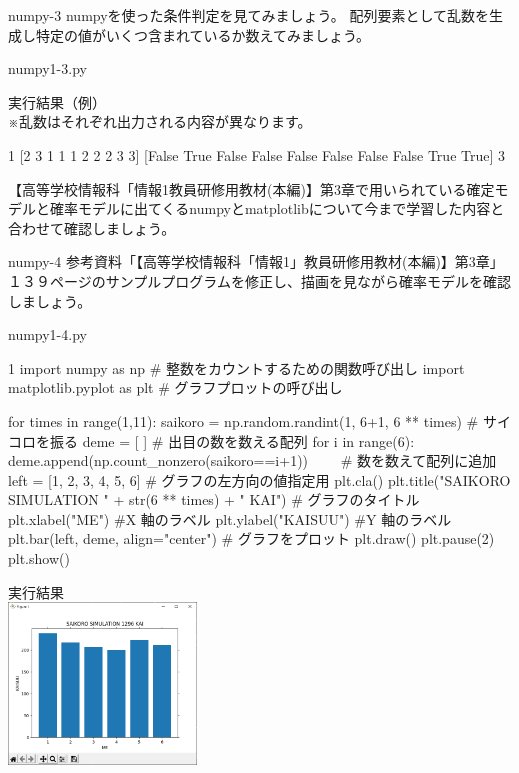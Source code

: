 \newpage
\begin{pabox}{numpy-3}
numpyを使った条件判定を見てみましょう。
配列要素として乱数を生成し特定の値がいくつ含まれているか数えてみましょう。

\begin{legbox}{numpy1-3.py}

実行結果（例）\\
※乱数はそれぞれ出力される内容が異なります。\\
\begin{listing}{1}
[2 3 1 1 1 2 2 2 3 3]
[False  True False False False False False False  True  True]
3
\end{listing}
\end{legbox}

\end{pabox}

【高等学校情報科「情報1教員研修用教材(本編)】第3章で用いられている確定モデルと確率モデルに出てくるnumpyとmatplotlibについて今まで学習した内容と合わせて確認しましょう。
\newpage
\begin{pabox}{numpy-4}
参考資料「【高等学校情報科「情報1」教員研修用教材(本編)】第3章」１３９ページのサンプルプログラムを修正し、描画を見ながら確率モデルを確認しましょう。

\begin{legbox}{numpy1-4.py}
\begin{listing}{1}
import numpy as np # 整数をカウントするための関数呼び出し
import matplotlib.pyplot as plt # グラフプロットの呼び出し

for times in range(1,11):
    saikoro = np.random.randint(1, 6+1, 6 ** times) # サイコロを振る
    deme = [ ] # 出目の数を数える配列
    for i in range(6):
        deme.append(np.count_nonzero(saikoro==i+1)) 
　　# 数を数えて配列に追加
    left = [1, 2, 3, 4, 5, 6] # グラフの左方向の値指定用
    plt.cla()
    plt.title("SAIKORO SIMULATION " + str(6 ** times) + " KAI") 
                    # グラフのタイトル
    plt.xlabel("ME") #X 軸のラベル
    plt.ylabel("KAISUU") #Y 軸のラベル
    plt.bar(left, deme, align="center") # グラフをプロット
    plt.draw() 
    plt.pause(2)
plt.show()
\end{listing}

実行結果\\

\includegraphics[width=5cm]{images/graph5.png} 

\end{legbox}


\end{pabox}

